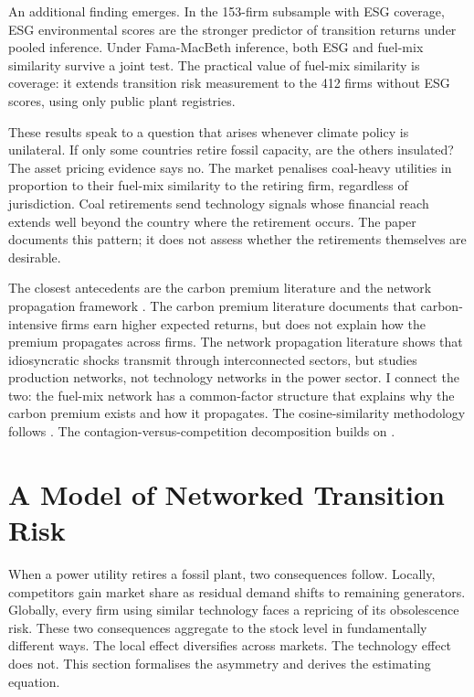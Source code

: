 \documentclass[12pt,a4paper]{article}
\begin{document}
An additional finding emerges. In the 153-firm subsample with ESG coverage, ESG environmental scores are the stronger predictor of transition returns under pooled inference. Under Fama-MacBeth inference, both ESG and fuel-mix similarity survive a joint test. The practical value of fuel-mix similarity is coverage: it extends transition risk measurement to the 412 firms without ESG scores, using only public plant registries.

These results speak to a question that arises whenever climate policy is unilateral. If only some countries retire fossil capacity, are the others insulated? The asset pricing evidence says no. The market penalises coal-heavy utilities in proportion to their fuel-mix similarity to the retiring firm, regardless of jurisdiction. Coal retirements send technology signals whose financial reach extends well beyond the country where the retirement occurs. The paper documents this pattern; it does not assess whether the retirements themselves are desirable.

The closest antecedents are the carbon premium literature \citep{Bolton2021, BoltonKacperczyk2023} and the network propagation framework \citep{AcemogluCarvalhoOzdaglarTahbazSalehi2012}. The carbon premium literature documents that carbon-intensive firms earn higher expected returns, but does not explain how the premium propagates across firms. The network propagation literature shows that idiosyncratic shocks transmit through interconnected sectors, but studies production networks, not technology networks in the power sector. I connect the two: the fuel-mix network has a common-factor structure that explains why the carbon premium exists and how it propagates. The cosine-similarity methodology follows \citet{HobergPhillips2016}. The contagion-versus-competition decomposition builds on \citet{LangStulz1992}.


\section{A Model of Networked Transition Risk}\label{sec:model}

When a power utility retires a fossil plant, two consequences follow. Locally, competitors gain market share as residual demand shifts to remaining generators. Globally, every firm using similar technology faces a repricing of its obsolescence risk. These two consequences aggregate to the stock level in fundamentally different ways. The local effect diversifies across markets. The technology effect does not. This section formalises the asymmetry and derives the estimating equation.
\end{document}
